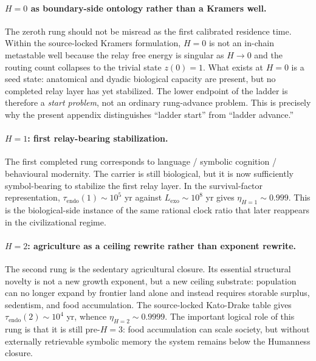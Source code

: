 \documentclass[11pt]{article}
\begin{document}
\paragraph{$H{=}0$ as boundary-side ontology rather than a Kramers well.}
The zeroth rung should not be misread as the first calibrated residence time.
Within the source-locked Kramers formulation,
$H{=}0$ is not an in-chain metastable well because the relay free energy is
singular as $H\to 0$ and the routing count collapses to the trivial state
$z(0)=1$.
What exists at $H{=}0$ is a seed state: anatomical and dyadic biological
capacity are present, but no completed relay layer has yet stabilized.
The lower endpoint of the ladder is therefore a \emph{start problem},
not an ordinary rung-advance problem.
This is precisely why the present appendix distinguishes
``ladder start'' from ``ladder advance.''

\paragraph{$H{=}1$: first relay-bearing stabilization.}
The first completed rung corresponds to language / symbolic cognition /
behavioural modernity.
The carrier is still biological,
but it is now sufficiently symbol-bearing to stabilize the first relay layer.
In the survival-factor representation,
$\tau_{\mathrm{endo}}(1)\sim 10^{5}$ yr against
$L_{\mathrm{exo}}\sim 10^{8}$ yr gives
$\eta_{H=1}\sim 0.999$.
This is the biological-side instance of the same rational clock ratio that
later reappears in the civilizational regime.

\paragraph{$H{=}2$: agriculture as a ceiling rewrite rather than exponent rewrite.}
The second rung is the sedentary agricultural closure.
Its essential structural novelty is not a new growth exponent,
but a new ceiling substrate:
population can no longer expand by frontier land alone and instead requires
storable surplus,
sedentism,
and food accumulation.
The source-locked Kato-Drake table gives
$\tau_{\mathrm{endo}}(2)\sim 10^{4}$ yr,
whence
$\eta_{H=2}\sim 0.9999$.
The important logical role of this rung is that it is still pre-$H{=}3$:
food accumulation can scale society,
but without externally retrievable symbolic memory the system remains below the
Humanness closure.
\end{document}
